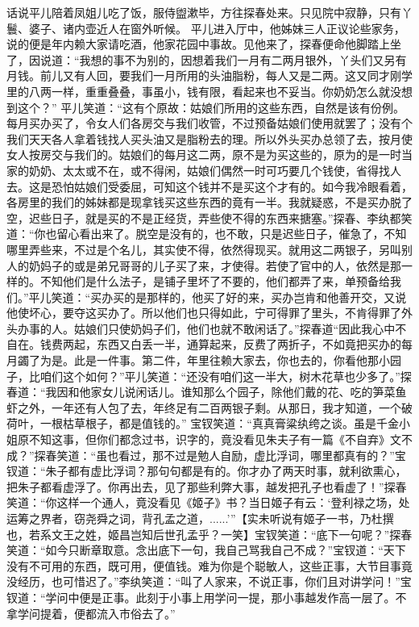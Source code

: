 \documentclass[12pt,oneside]{book}
\begin{document}
话说平儿陪着凤姐儿吃了饭，服侍盥漱毕，方往探春处来。只见院中寂静，只有丫鬟、婆子、诸内壶近人在窗外听候。
平儿进入厅中，他姊妹三人正议论些家务，说的便是年内赖大家请吃酒，他家花园中事故。见他来了，探春便命他脚踏上坐了，因说道：“我想的事不为别的，因想着我们一月有二两月银外，丫头们又另有月钱。前儿又有人回，要我们一月所用的头油脂粉，每人又是二两。这又同才刚学里的八两一样，重重叠叠，事虽小，钱有限，看起来也不妥当。你奶奶怎么就没想到这个？”
平儿笑道：“这有个原故：姑娘们所用的这些东西，自然是该有份例。每月买办买了，令女人们各房交与我们收管，不过预备姑娘们使用就罢了；没有个我们天天各人拿着钱找人买头油又是脂粉去的理。所以外头买办总领了去，按月使女人按房交与我们的。姑娘们的每月这二两，原不是为买这些的，原为的是一时当家的奶奶、太太或不在，或不得闲，姑娘们偶然一时可巧要几个钱使，省得找人去。这是恐怕姑娘们受委屈，可知这个钱并不是买这个才有的。如今我冷眼看着，各房里的我们的姊妹都是现拿钱买这些东西的竟有一半。我就疑惑，不是买办脱了空，迟些日子，就是买的不是正经货，弄些使不得的东西来搪塞。”探春、李纨都笑道：“你也留心看出来了。脱空是没有的，也不敢，只是迟些日子，催急了，不知哪里弄些来，不过是个名儿，其实使不得，依然得现买。就用这二两银子，另叫别人的奶妈子的或是弟兄哥哥的儿子买了来，才使得。若使了官中的人，依然是那一样的。不知他们是什么法子，是铺子里坏了不要的，他们都弄了来，单预备给我们。”平儿笑道：“买办买的是那样的，他买了好的来，买办岂肯和他善开交，又说他使坏心，要夺这买办了。所以他们也只得如此，宁可得罪了里头，不肯得罪了外头办事的人。姑娘们只使奶妈子们，他们也就不敢闲话了。”探春道“因此我心中不自在。钱费两起，东西又白丢一半，通算起来，反费了两折子，不如竟把买办的每月蠲了为是。此是一件事。第二件，年里往赖大家去，你也去的，你看他那小园子，比咱们这个如何？”平儿笑道：“还没有咱们这一半大，树木花草也少多了。”探春道：“我因和他家女儿说闲话儿。谁知那么个园子，除他们戴的花、吃的笋菜鱼虾之外，一年还有人包了去，年终足有二百两银子剩。从那日，我才知道，一个破荷叶，一根枯草根子，都是值钱的。”
宝钗笑道：“真真膏粱纨绔之谈。虽是千金小姐原不知这事，但你们都念过书，识字的，竟没看见朱夫子有一篇《不自弃》文不成？”探春笑道：“虽也看过，那不过是勉人自励，虚比浮词，哪里都真有的？”宝钗道：“朱子都有虚比浮词？那句句都是有的。你才办了两天时事，就利欲熏心，把朱子都看虚浮了。你再出去，见了那些利弊大事，越发把孔子也看虚了！”探春笑道：“你这样一个通人，竟没看见《姬子》书？当日姬子有云：‘登利禄之场，处运筹之界者，窃尧舜之词，背孔孟之道，......’”【实未听说有姬子一书，乃杜撰也，若系文王之姓，姬昌岂知后世孔孟乎？一笑】宝钗笑道：“底下一句呢？”探春笑道：“如今只断章取意。念出底下一句，我自己骂我自己不成？”宝钗道：“天下没有不可用的东西，既可用，便值钱。难为你是个聪敏人，这些正事，大节目事竟没经历，也可惜迟了。”李纨笑道：“叫了人家来，不说正事，你们且对讲学问！”宝钗道：“学问中便是正事。此刻于小事上用学问一提，那小事越发作高一层了。不拿学问提着，便都流入市俗去了。”
\end{document}
